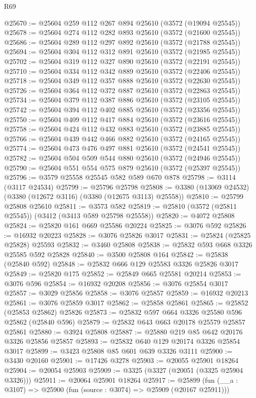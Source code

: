 \begin{lexlean}{R69}
\begin{coremodule}
@25670 := @25604 @259 @112 @267 @894 @25610 (@3572 (@19094 @25545))
@25678 := @25604 @274 @112 @282 @893 @25610 (@3572 (@21600 @25545))
@25686 := @25604 @289 @112 @297 @892 @25610 (@3572 (@21788 @25545))
@25694 := @25604 @304 @112 @312 @891 @25610 (@3572 (@21985 @25545))
@25702 := @25604 @319 @112 @327 @890 @25610 (@3572 (@22191 @25545))
@25710 := @25604 @334 @112 @342 @889 @25610 (@3572 (@22406 @25545))
@25718 := @25604 @349 @112 @357 @888 @25610 (@3572 (@22630 @25545))
@25726 := @25604 @364 @112 @372 @887 @25610 (@3572 (@22863 @25545))
@25734 := @25604 @379 @112 @387 @886 @25610 (@3572 (@23105 @25545))
@25742 := @25604 @394 @112 @402 @885 @25610 (@3572 (@23356 @25545))
@25750 := @25604 @409 @112 @417 @884 @25610 (@3572 (@23616 @25545))
@25758 := @25604 @424 @112 @432 @883 @25610 (@3572 (@23885 @25545))
@25766 := @25604 @439 @442 @466 @882 @25610 (@3572 (@24165 @25545))
@25774 := @25604 @473 @476 @497 @881 @25610 (@3572 (@24541 @25545))
@25782 := @25604 @504 @509 @544 @880 @25610 (@3572 (@24946 @25545))
@25790 := @25604 @551 @554 @575 @879 @25610 (@3572 (@25397 @25545))
@25796 := @3579 @25558 @25545 @582 @589 @670 @878
@25798 := @3114 (@3117 @24534)
@25799 := @25796 @25798
@25808 := @3380 (@13069 @24532) (@3380 (@12672 @3116) (@3380 (@12675 @3113) @25558))
@25810 := @25799 @25808 @25610
@25811 := @3573 @582
@25819 := @25810 (@3572 (@25811 @25545)) (@3412 (@3413 @589 @25798 @25558))
@25820 := @4072 @25808
@25824 := @25820 @161 @669 @25586 @20224
@25825 := @3076 @592
@25826 := @16932 @20223
@25828 := @3076 @25826 @3017
@25831 := @25824 (@25825 @25828) @25593
@25832 := @3460 @25808
@25838 := @25832 @593 @668 @3326 @25585 @592 @25828
@25840 := @3500 @25808 @164
@25842 := @25838 (@25840 @592)
@25848 := @25832 @666 @129 @25583 @3326 @25826 @3017
@25849 := @25820 @175
@25852 := @25849 @665 @25581 @20214
@25853 := @3076 @596
@25854 := @16932 @20208
@25856 := @3076 @25854 @3017
@25857 := @3029 @25856
@25858 := @3076 @25857
@25859 := @16932 @20213
@25861 := @3076 @25859 @3017
@25862 := @25858 @25861
@25865 := @25852 (@25853 @25862) @25826
@25873 := @25832 @597 @664 @3326 @25580 @596 @25862 (@25840 @596)
@25879 := @25832 @643 @663 @20178 @25579 @25857 @25861
@25880 := @3924 @25808
@25887 := @25880 @219 @85 @642 @20176 @3326 @25856 @25857
@25893 := @25832 @640 @129 @20174 @3326 @25854 @3017
@25899 := @3423 @25808 @85 @601 @639 @3326 @3111
@25900 := @3430 @20160
@25901 := @17426 @3278
@25903 := @20055 @25901 @18264
@25904 := @20054 @25903
@25909 := @3325 (@3327 (@20051 (@3325 @25904 @3326)))
@25911 := @20064 @25901 @18264
@25917 := @25899 (fun (__a : @3107) => @25900 (fun (source : @3074) => @25909 (@20167 @25911)))

\end{coremodule}
\end{lexlean}

